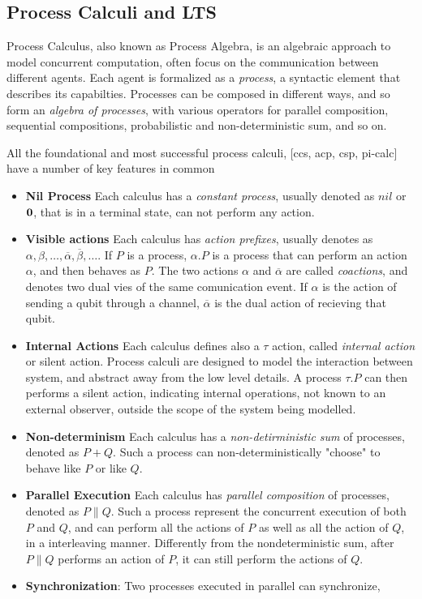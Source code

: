 \subsection{Process Calculi and LTS}


Process Calculus, also known as Process Algebra, is an algebraic approach to model concurrent computation, often focus on the communication between different agents. Each agent is formalized as a \textit{process}, a syntactic element that describes its capabilties. Processes can be composed in different ways, and so form an \textit{algebra of processes}, with various operators for parallel composition, sequential compositions, probabilistic and non-deterministic sum, and so on.

All the foundational and most successful process calculi, [ccs, acp, csp, pi-calc] have a number of key features in common \begin{itemize}
\item \textbf{Nil Process} Each calculus has a \textit{constant process}, usually denoted as $nil$ or $\mathbf{0}$, that is in a terminal state, can not perform any action.
\item \textbf{Visible actions} Each calculus has \textit{action prefixes}, usually denotes as $\alpha, \beta, \ldots, \overline{\alpha}, \overline{\beta}, \ldots$. If $P$ is a process, $\alpha.P$ is a process that can perform an action $\alpha$, and then behaves as $P$. The two actions $\alpha$ and $\overline{\alpha}$ are called \textit{coactions}, and denotes two dual vies of the same comunication event. If $\alpha$ is the action of sending a qubit through a channel, $\overline{\alpha}$ is the dual action of recieving that qubit. 
\item \textbf{Internal Actions} Each calculus defines also a $\tau$ action, called \textit{internal action} or silent action. Process calculi are designed to model the interaction between system, and abstract away from the low level details. A process $\tau.P$ can then performs a silent action, indicating internal operations, not known to an external observer, outside the scope of the system being modelled. 
\item \textbf{Non-determinism} Each calculus has a \textit{non-detirministic sum} of processes, denoted as $P + Q$. Such a process can non-deterministically "choose" to behave like $P$ or like $Q$. 
\item \textbf{Parallel Execution} Each calculus has \textit{parallel composition} of processes, denoted as $P \parallel Q$. Such a process represent the concurrent execution of both $P$ and $Q$, and can perform all the actions of $P$ as well as all the action of $Q$, in a interleaving manner. Differently from the nondeterministic sum, after $P\parallel Q$ performs an action of $P$, it can still perform the actions of $Q$.

\item \textbf{Synchronization}: Two processes executed in parallel can synchronize, 
\end{itemize}



